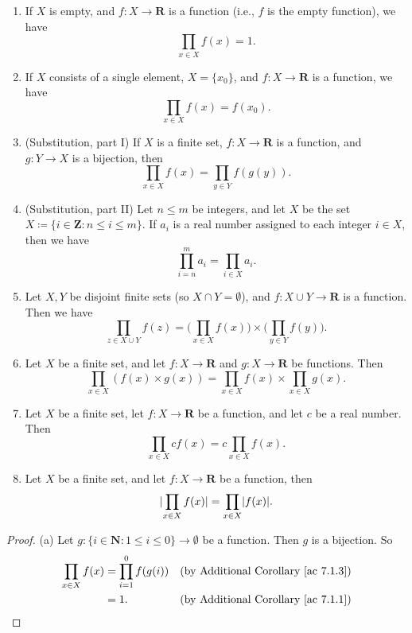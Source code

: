 \begin{additional corollary}\label{ac 7.1.5}
\mbox{}
\begin{enumerate}
    \item If \(X\) is empty, and \(f : X \to \mathbf{R}\) is a function (i.e., \(f\) is the empty function), we have
          \[
              \prod_{x \in X} f(x) = 1.
          \]
    \item If \(X\) consists of a single element, \(X = \{x_0\}\), and \(f : X \to \mathbf{R}\) is a function, we have
          \[
              \prod_{x \in X} f(x) = f(x_0).
          \]
    \item (Substitution, part I) If \(X\) is a finite set, \(f : X \to \mathbf{R}\) is a function, and \(g : Y \to X\) is a bijection, then
          \[
              \prod_{x \in X} f(x) = \prod_{y \in Y} f(g(y)).
          \]
    \item (Substitution, part II) Let \(n \leq m\) be integers, and let \(X\) be the set \(X \coloneqq \{i \in \mathbf{Z} : n \leq i \leq m\}\).
          If \(a_i\) is a real number assigned to each integer \(i \in X\), then we have
          \[
              \prod_{i = n}^m a_i = \prod_{i \in X} a_i.
          \]
    \item Let \(X, Y\) be disjoint finite sets (so \(X \cap Y = \emptyset\)), and \(f : X \cup Y \to \mathbf{R}\) is a function.
          Then we have
          \[
              \prod_{z \in X \cup Y} f(z) = \Bigg(\prod_{x \in X} f(x)\Bigg) \times \Bigg(\prod_{y \in Y} f(y)\Bigg).
          \]
    \item Let \(X\) be a finite set, and let \(f : X \to \mathbf{R}\) and \(g : X \to \mathbf{R}\) be functions.
          Then
          \[
              \prod_{x \in X} (f(x) \times g(x)) = \prod_{x \in X} f(x) \times \prod_{x \in X} g(x).
          \]
    \item Let \(X\) be a finite set, let \(f : X \to \mathbf{R}\) be a function, and let \(c\) be a real number.
          Then
          \[
              \prod_{x \in X} cf(x) = c\prod_{x \in X} f(x).
          \]
    \item Let \(X\) be a finite set, and let \(f : X \to \mathbf{R}\) be a function, then
          \[
              \lvert\prod_{x \in X} f(x)\rvert = \prod_{x \in X} \lvert f(x)\rvert.
          \]
\end{enumerate}
\end{additional corollary}

\begin{proof}{(a)}
    Let \(g : \{i \in \mathbf{N} : 1 \leq i \leq 0\} \to \emptyset\) be a function.
    Then \(g\) is a bijection.
    So
    \begin{align*}
        \prod_{x \in X} f(x) & = \prod_{i = 1}^0 f(g(i)) & \text{(by Additional Corollary \ref{ac 7.1.3})} \\
                             & = 1.                      & \text{(by Additional Corollary \ref{ac 7.1.1})}
    \end{align*}
\end{proof}

